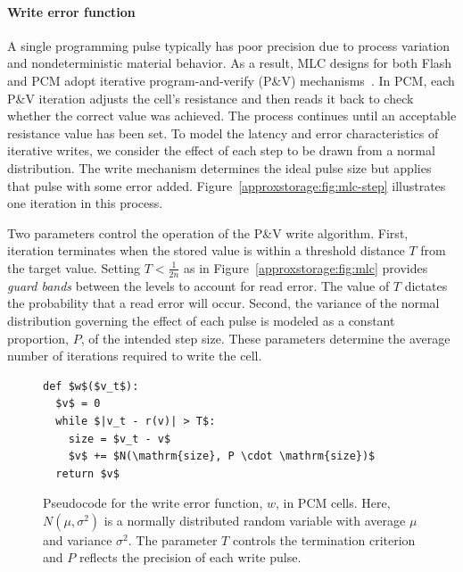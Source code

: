\paragraph{Write error function}

A single programming pulse typically has poor
precision due to process variation and nondeterministic material
behavior. As a result, MLC designs for both Flash and PCM adopt iterative
program-and-verify (P\&V) mechanisms~\cite{morphablepcm,mlcflash}.
In PCM, each P\&V iteration adjusts the cell's resistance and then reads it
back to check whether the
correct value was achieved.
The process continues until an acceptable resistance value has been set.
To model the latency and error characteristics of iterative writes, we
consider the effect of each step to be drawn from a normal
distribution. The write mechanism determines the ideal pulse size but
applies that pulse with some error added.
Figure~\ref{approxstorage:fig:mlc-step} illustrates one iteration in this process.

Two parameters control the operation of the P\&V write algorithm.
First, iteration terminates when the stored value is within a
threshold distance $T$ from the target value. 
Setting $T < \frac{1}{2n}$ as in Figure~\ref{approxstorage:fig:mlc} provides \emph{guard bands} between the
levels to account for read error. The value of $T$ dictates the probability
that a read error will occur.
Second, the variance of
the normal distribution governing the effect of each pulse is modeled
as a constant proportion, $P$, of the intended step size. These parameters
determine the average number of iterations required to write the cell.

\begin{figure}
    \begin{center}
    \begin{minipage}{2in}
    \begin{lstlisting}[mathescape]
def $w$($v_t$):
  $v$ = 0
  while $|v_t - r(v)| > T$:
    size = $v_t - v$
    $v$ += $N(\mathrm{size}, P \cdot \mathrm{size})$
  return $v$
\end{lstlisting}
    \end{minipage}
    \end{center}
    \caption{
        Pseudocode for the write error function, $w$, in PCM
        cells.
        Here, $N(\mu, \sigma^2)$ is a normally distributed random
        variable
        with average $\mu$ and variance
        $\sigma^2$. The parameter $T$ controls the termination
        criterion and $P$ reflects the precision of each write pulse.
    }
    \label{approxstorage:fig:pcode-pcm}
\end{figure}

